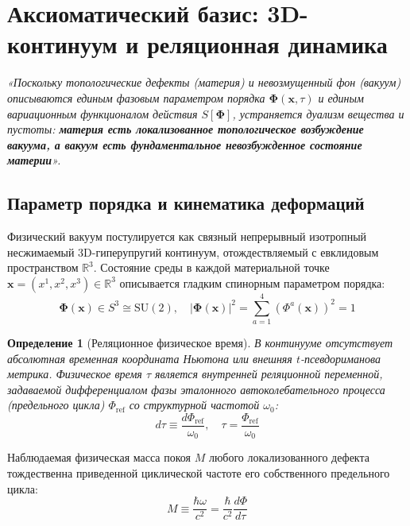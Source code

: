 \documentclass[12pt,a4paper]{article}
\newtheorem{definition}{Определение}
\begin{document}
	\newpage
	
	\section{Аксиоматический базис: 3D-континуум и реляционная динамика}

\begin{center}
	\textit{«Поскольку топологические дефекты (материя) и невозмущенный фон (вакуум) описываются единым фазовым параметром порядка $\boldsymbol{\Phi}(\mathbf{x}, \tau)$ и единым вариационным функционалом действия $S[\boldsymbol{\Phi}]$, устраняется дуализм вещества и пустоты: \textbf{материя есть локализованное топологическое возбуждение вакуума, а вакуум есть фундаментальное невозбужденное состояние материи}».}
\end{center}
	
	\subsection{Параметр порядка и кинематика деформаций}
Физический вакуум постулируется как связный непрерывный изотропный несжимаемый 3D-гиперупругий континуум, отождествляемый с евклидовым пространством $\mathbb{R}^3$. Состояние среды в каждой материальной точке $\mathbf{x} = (x^1, x^2, x^3) \in \mathbb{R}^3$ описывается гладким спинорным параметром порядка:
\begin{equation}
	\boldsymbol{\Phi}(\mathbf{x}) \in S^3 \cong \mathrm{SU}(2), \quad |\boldsymbol{\Phi}(\mathbf{x})|^2 = \sum_{a=1}^4 (\Phi^a(\mathbf{x}))^2 = 1
\end{equation}

\begin{definition}[Реляционное физическое время]
	В континууме отсутствует абсолютная временная координата Ньютона или внешняя $t$-псевдориманова метрика. Физическое время $\tau$ является внутренней реляционной переменной, задаваемой дифференциалом фазы эталонного автоколебательного процесса (предельного цикла) $\Phi_{\text{ref}}$ со структурной частотой $\omega_0$:
	\begin{equation}
		d\tau \equiv \frac{d\Phi_{\text{ref}}}{\omega_0}, \quad \tau = \frac{\Phi_{\text{ref}}}{\omega_0}
	\end{equation}
\end{definition}

Наблюдаемая физическая масса покоя $M$ любого локализованного дефекта тождественна приведенной циклической частоте его собственного предельного цикла:
\begin{equation}
	M \equiv \frac{\hbar \omega}{c^2} = \frac{\hbar}{c^2} \frac{d\Phi}{d\tau}
\end{equation}
\end{document}
